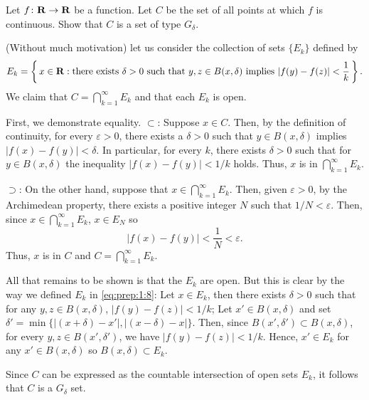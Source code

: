 \begin{problem}
  Let $f\colon\mathbf{R}\to\mathbf{R}$ be a function. Let $C$ be the set of all points
  at which $f$ is continuous. Show that $C$ is a set of type $G_\delta$.
\end{problem}
\begin{solution}
  (Without much motivation) let us consider the collection of sets
  $\{E_k\}$ defined by
  \begin{equation}
    \label{eq:prep:1:8}
    E_k=\left\{\,x\in\mathbf{R}:
      \text{there exists $\delta>0$ such that $y,z\in B(x,\delta)$ implies $\left|f(y)-f(z)\right|<\frac{1}{k}$}\,\right\}.
  \end{equation}
  We claim that $C=\bigcap_{k=1}^\infty E_k$ and that each $E_k$ is open.
  \begin{solution}
    First, we demonstrate equality. $\subset$: Suppose $x\in C$. Then, by
    the definition of continuity, for every $\varepsilon>0$, there exists a
    $\delta>0$ such that $y\in B(x,\delta)$ implies
    $|f(x)-f(y)|<\delta$. In particular, for every $k$, there exists
    $\delta>0$ such that for $y\in B(x,\delta)$ the inequality
    $|f(x)-f(y)|<1/k$ holds. Thus, $x$ is in $\bigcap_{k=1}^\infty E_k$.

    $\supset$: On the other hand, suppose that
    $x\in\bigcap_{k=1}^\infty E_k$. Then, given $\varepsilon>0$, by the
    Archimedean property, there exists a positive integer $N$ such that
    $1/N<\varepsilon$. Then, since $x\in\bigcap_{k=1}^\infty E_k$,
    $x\in E_N$ so
    \begin{equation}
      \label{eq:prep:1:9}
      |f(x)-f(y)|<\frac{1}{N}<\varepsilon.
    \end{equation}
    Thus, $x$ is in $C$ and $C=\bigcap_{k=1}^\infty E_k$.

    All that remains to be shown is that the $E_k$ are open. But this is
    clear by the way we defined $E_k$ in \eqref{eq:prep:1:8}: Let
    $x\in E_k$, then there exists $\delta>0$ such that for any
    $y,z\in B(x,\delta)$, $|f(y)-f(z)|<1/k$; Let $x'\in B(x,\delta)$ and
    set $\delta'=\min\{|(x+\delta)-x'|,|(x-\delta)-x|\}$. Then, since
    $B(x',\delta')\subset B(x,\delta)$, for every $y,z\in B(x',\delta')$,
    we have $|f(y)-f(z)|<1/k$. Hence, $x'\in E_k$ for any
    $x'\in B(x,\delta)$ so $B(x,\delta)\subset E_k$.
  \end{solution}
  Since $C$ can be expressed as the countable intersection of open sets
  $E_k$, it follows that $C$ is a $G_\delta$ set.
\end{solution}
